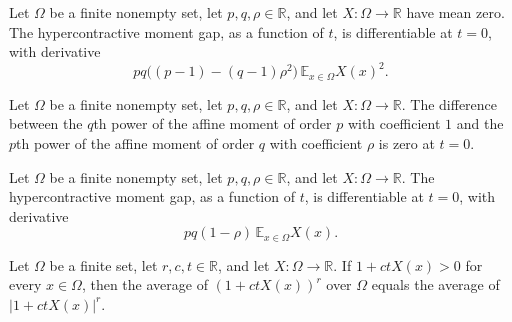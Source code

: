 \begin{theorem}
\label{FABL.hypercontractiveMomentGapDeriv_hasDerivAt_zero}
\leanok
{}
Let $\Omega$ be a finite nonempty set, let $p,q,\rho\in\mathbb R$, and let
$X:\Omega\to\mathbb R$ have mean zero. The hypercontractive moment gap, as a function of
$t$, is differentiable at $t=0$, with derivative
\[pq\bigl((p-1)-(q-1)\rho^2\bigr)\,\mathbb E_{x\in\Omega}X(x)^2.\]
\end{theorem}

\begin{theorem}
\label{FABL.hypercontractiveMomentGap_zero}
\leanok
{}
Let $\Omega$ be a finite nonempty set, let $p,q,\rho\in\mathbb{R}$, and let
$X\colon\Omega\to\mathbb{R}$. The difference between the $q$th power of the affine
moment of order $p$ with coefficient $1$ and the $p$th power of the affine moment of
order $q$ with coefficient $\rho$ is zero at $t=0$.
\end{theorem}

\begin{theorem}
\label{FABL.hypercontractiveMomentGap_hasDerivAt_zero}
\leanok
{}
Let $\Omega$ be a finite nonempty set, let $p,q,\rho\in\mathbb R$, and let
$X:\Omega\to\mathbb R$. The hypercontractive moment gap, as a function of $t$, is
differentiable at $t=0$, with derivative
\[pq(1-\rho)\,\mathbb E_{x\in\Omega}X(x).\]
\end{theorem}

\begin{theorem}
\label{FABL.affineMoment_eq_absMoment}
\leanok
{}
Let $\Omega$ be a finite set, let $r,c,t\in\mathbb R$, and let $X:\Omega\to\mathbb R$.
If $1+ctX(x)>0$ for every $x\in\Omega$, then the average of $(1+ctX(x))^r$ over $\Omega$
equals the average of $|1+ctX(x)|^r$.
\end{theorem}


